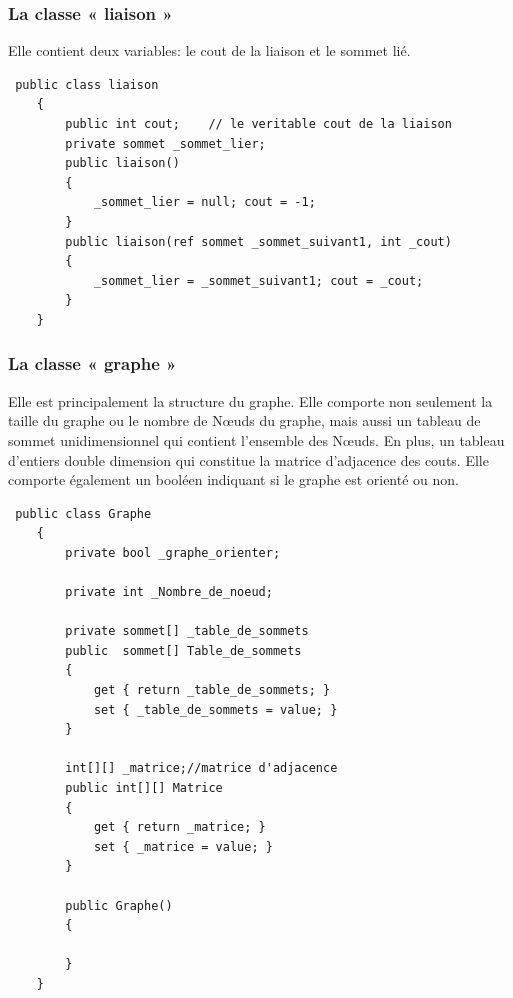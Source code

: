 \documentclass[11pt,twoside,a4paper]{article}
\begin{document}
\subsubsection{La classe « liaison »}
Elle contient deux variables: le cout de la liaison et le sommet lié.
\begin{verbatim}
 public class liaison
    {
        public int cout;	// le veritable cout de la liaison
        private sommet _sommet_lier;
        public liaison()
        {
            _sommet_lier = null; cout = -1;
        }
        public liaison(ref sommet _sommet_suivant1, int _cout)
        {
            _sommet_lier = _sommet_suivant1; cout = _cout;
        }
    }
\end{verbatim}

\subsubsection{La classe « graphe »}
Elle est principalement la structure du graphe. Elle comporte non seulement la taille du graphe ou le nombre de Nœuds du graphe, mais aussi un tableau de sommet unidimensionnel qui contient l’ensemble des Nœuds. En plus, un tableau d’entiers double dimension qui constitue la matrice d’adjacence des couts. Elle comporte également un booléen indiquant si le graphe est orienté ou non.
\begin{verbatim}
 public class Graphe
    {
        private bool _graphe_orienter;	

        private int _Nombre_de_noeud;

        private sommet[] _table_de_sommets
        public  sommet[] Table_de_sommets
        {
            get { return _table_de_sommets; }
            set { _table_de_sommets = value; }
        }

        int[][] _matrice;//matrice d'adjacence
        public int[][] Matrice
        {
            get { return _matrice; }
            set { _matrice = value; }
        }

        public Graphe()
        {
 
        }
    }
\end{verbatim}
\end{document}
